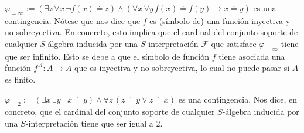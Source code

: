 \begin{example}
$\varphi_{=\infty} := (\exists z \, \forall x \, \neg f(x) \doteq z) \land (\forall x \, \forall y \, f(x) \doteq f(y) \rightarrow x \doteq y)$ es una contingencia. Nótese que nos dice que $f$ es (símbolo de) una función inyectiva y no sobreyectiva. En concreto, esto implica que el cardinal del conjunto soporte de cualquier $S$-álgebra inducida por una $S$-interpretación $\mathcal{F}$ que satisface $\varphi_{=\infty}$ tiene que ser infinito. Esto se debe a que el símbolo de función $f$ tiene asociada una función $f^\mathcal{A}:A\to A$ que es inyectiva y no sobreyectiva, lo cual no puede pasar si $A$ es finito.
\end{example}

\begin{example}
$\varphi_{=2} := (\exists x \, \exists y \, \neg x \doteq y) \land \forall z \, (z \doteq y \lor z \doteq x)$ es una contingencia. Nos dice, en concreto, que el cardinal del conjunto soporte de cualquier $S$-álgebra inducida por una $S$-interpretación tiene que ser igual a 2.
\end{example}